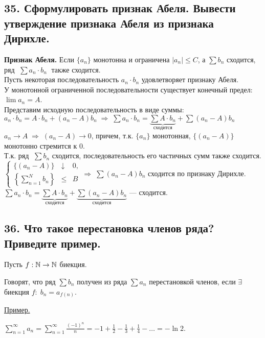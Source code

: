 \documentclass[a4paper, fleqn]{article}
\begin{document}
    \subsection*{35. Сформулировать признак Абеля. Вывести утверждение признака Абеля из признака Дирихле.}
	\textbf{Признак Абеля. } Если $\{ a_n \}$ монотонна и ограничена $|a_n| \le C$, а $\sum b_n$ сходится,
	ряд $\; \sum a_n \cdot b_n \;$ также сходится.\\[5 pt]
	Пусть некоторая последовательность $a_n \cdot b_n$ удовлетворяет признаку Абеля. \\[3 pt]
	У монотонной ограниченной последовательности существует конечный предел: $\lim a_n = A$. \\[3 pt]
	Представим исходную последовательность в виде суммы: \\[3 pt]
	$a_n \cdot b_n = A \cdot b_n + (a_n - A) b_n \; \Rightarrow \; 
	\sum a_n \cdot b_n = \underbrace{\sum A \cdot b_n}_{\text{сходится}} + \sum (a_n - A) b_n$ \\[3 pt]
	$a_n \to A \; \Rightarrow \; (a_n - A) \to 0$, причем, т.к. $\{ a_n \}$ монотонная, $\{ (a_n - A) \}$ монотонно стремится к 0. \\[3 pt]
	Т.к. ряд $\;\sum b_n$ сходится, последовательность его частичных сумм также сходится. \\[3 pt]
	$\left\{\begin{array}{lll} 
	\{ (a_n - A) \} &\downarrow& 0,\\[10 pt]
	\left\{ \sum\limits_{n=1}^N b_n \right\} &\le& B
	\end{array}\right. \Rightarrow \; \sum (a_n - A) b_n$ сходится по признаку Дирихле.\\[3 pt]
	$\sum a_n \cdot b_n = \underbrace{\sum A \cdot b_n}_{\text{сходится}} +\underbrace{\sum (a_n - A) b_n}_{\text{сходится}}$ --- сходится.    

    
    \subsection*{36. Что такое перестановка членов ряда? Приведите пример.}
    
    Пусть $f: \mathbb{N} \to \mathbb{N}$ биекция.
    
    Говорят, что ряд $\sum b_n$ получен из ряда $\sum a_n$ перестановкой членов, если $\exists$ биекция $f: \; b_n = a_{f(n)}.$ 
    
    \underline{Пример.}
    
    $\displaystyle \sum_{n = 1}^{\infty} a_n = \sum_{n = 1}^{\infty} \frac{(-1)^n}{n} = -1 + \frac{1}{2} - \frac{1}{3} + \frac{1}{4} - \dots = -\ln 2.$
    
\end{document}
